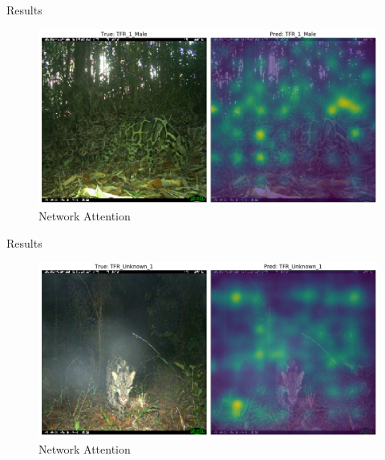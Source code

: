 \documentclass[10pt]{beamer}
\begin{document}
\begin{frame}{Results}
	\centering
	\begin{figure}
		\includegraphics[width=\columnwidth]{images/result_leo_3.png}
		\caption{Network Attention}
	\end{figure}
\end{frame}



\begin{frame}{Results}
	\centering
	\begin{figure}
		\includegraphics[width=\columnwidth]{images/result_leo_2.png}
		\caption{Network Attention}
	\end{figure}
\end{frame}

\end{document}
